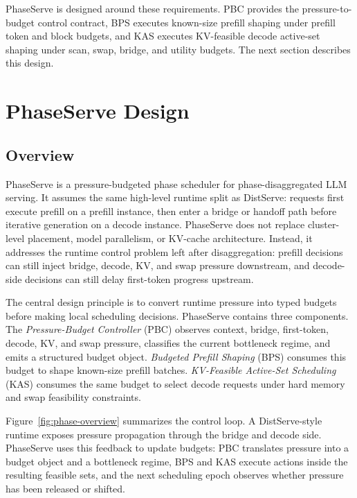 \documentclass[lettersize,journal]{IEEEtran}
\begin{document}
PhaseServe is designed around these requirements. PBC provides the pressure-to-budget control contract, BPS executes known-size prefill shaping under prefill token and block budgets, and KAS executes KV-feasible decode active-set shaping under scan, swap, bridge, and utility budgets. The next section describes this design.


















\section{PhaseServe Design}\label{design}

\subsection{Overview}

PhaseServe is a pressure-budgeted phase scheduler for phase-disaggregated LLM serving. It assumes the same high-level runtime split as DistServe: requests first execute prefill on a prefill instance, then enter a bridge or handoff path before iterative generation on a decode instance. PhaseServe does not replace cluster-level placement, model parallelism, or KV-cache architecture. Instead, it addresses the runtime control problem left after disaggregation: prefill decisions can still inject bridge, decode, KV, and swap pressure downstream, and decode-side decisions can still delay first-token progress upstream.

The central design principle is to convert runtime pressure into typed budgets before making local scheduling decisions. PhaseServe contains three components. The \emph{Pressure-Budget Controller} (PBC) observes context, bridge, first-token, decode, KV, and swap pressure, classifies the current bottleneck regime, and emits a structured budget object. \emph{Budgeted Prefill Shaping} (BPS) consumes this budget to shape known-size prefill batches. \emph{KV-Feasible Active-Set Scheduling} (KAS) consumes the same budget to select decode requests under hard memory and swap feasibility constraints.

Figure~\ref{fig:phase-overview} summarizes the control loop. A DistServe-style runtime exposes pressure propagation through the bridge and decode side. PhaseServe uses this feedback to update budgets: PBC translates pressure into a budget object and a bottleneck regime, BPS and KAS execute actions inside the resulting feasible sets, and the next scheduling epoch observes whether pressure has been released or shifted.
\end{document}
